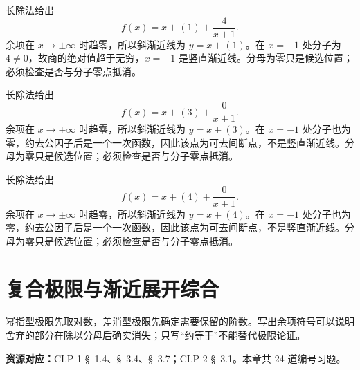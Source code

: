 \documentclass[UTF8,12pt,a4paper,fontset=fandol]{ctexart}
\begin{document}
\begin{solve}\label{ans:c4q22}
长除法给出
\[
f(x)=x+(1)+\frac{4}{x+1}.
\]
余项在 $x\to\pm\infty$ 时趋零，所以斜渐近线为 $y=x+(1)$。在 $x=-1$ 处分子为 $4\ne0$，故商的绝对值趋于无穷，$x=-1$ 是竖直渐近线。分母为零只是候选位置；必须检查是否与分子零点抵消。
\end{solve}

\begin{solve}\label{ans:c4q23}
长除法给出
\[
f(x)=x+(3)+\frac{0}{x+1}.
\]
余项在 $x\to\pm\infty$ 时趋零，所以斜渐近线为 $y=x+(3)$。在 $x=-1$ 处分子也为零，约去公因子后是一个一次函数，因此该点为可去间断点，不是竖直渐近线。分母为零只是候选位置；必须检查是否与分子零点抵消。
\end{solve}

\begin{solve}\label{ans:c4q24}
长除法给出
\[
f(x)=x+(4)+\frac{0}{x+1}.
\]
余项在 $x\to\pm\infty$ 时趋零，所以斜渐近线为 $y=x+(4)$。在 $x=-1$ 处分子也为零，约去公因子后是一个一次函数，因此该点为可去间断点，不是竖直渐近线。分母为零只是候选位置；必须检查是否与分子零点抵消。
\end{solve}

\clearpage
\section{复合极限与渐近展开综合}\label{sec:ch5}
幂指型极限先取对数，差消型极限先确定需要保留的阶数。写出余项符号可以说明舍弃的部分在除以分母后确实消失；只写“约等于”不能替代极限论证。

\textbf{资源对应：}CLP-1 \S~1.4、\S~3.4、\S~3.7；CLP-2 \S~3.1。本章共 24 道编号习题。
\end{document}
